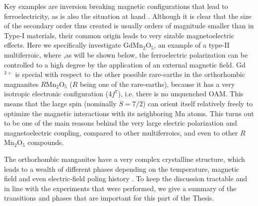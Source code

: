Key examples are inversion breaking magnetic configurations that lead to ferroelectricity, as is also the situation at hand .
Although it is clear that the size of the secondary order thus created is usually orders of magnitude smaller than in Type-I materials, their common origin leads to very sizable magnetoelectric effects.
Here we specifically investigate GdMn$_2$O$_5$, an example of a type-II multiferroic\cite{Khomskii2009}, where ,as will be shown below, the ferroelectric polarization can be controlled to a high degree by the application of an external magnetic field.
Gd$^{3+}$ is special with respect to the other possible rare-earths in the orthorhombic magnanites $R$Mn$_2$O$_5$ ($R$ being one of the rare-earths), because it has a very isotropic electronic configuration (4$f^7$), i.e. there is no unquenched OAM. This means that the large spin (nominally $S=7/2$) can orient itself relatively freely to optimize the magnetic interactions with its neighboring Mn atoms.
This turns out to be one of the main reasons behind the very large electric polarization and magnetoelectric coupling, compared to other multiferroics, and even to other $R$Mn$_2$O$_5$ compounds.

The orthorhombic manganites have a very complex crystalline structure, which leads to a wealth of different phases depending on the temperature, magnetic field and even electric-field poling history \cite{Zheng2019}.
To keep the discussion tractable and in line with the experiments that were performed, we give a summary of the transitions and phases that are important for this part of the Thesis.

